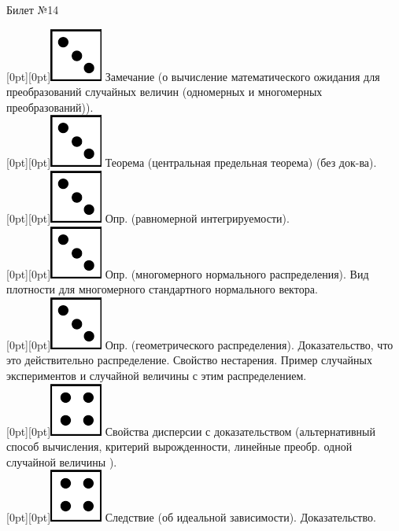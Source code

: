 \documentclass[10pt]{article}
\begin{document}
\begin{center} {\Large Билет №14} \end{center} 

\raisebox{-1pt}[0pt][0pt]{\includegraphics[width=0.02\linewidth]{3.png}} Замечание (о вычисление  математического ожидания для преобразований случайных величин (одномерных и многомерных преобразований)). \\

\raisebox{-1pt}[0pt][0pt]{\includegraphics[width=0.02\linewidth]{3.png}} Теорема (центральная предельная теорема) (без док-ва). \\

\raisebox{-1pt}[0pt][0pt]{\includegraphics[width=0.02\linewidth]{3.png}} Опр. (равномерной интегрируемости). \\

\raisebox{-1pt}[0pt][0pt]{\includegraphics[width=0.02\linewidth]{3.png}} Опр. (многомерного нормального распределения). Вид плотности для многомерного стандартного нормального вектора. \\ 

\raisebox{-1pt}[0pt][0pt]{\includegraphics[width=0.02\linewidth]{3.png}}  Опр. (геометрического распределения). Доказательство, что это действительно распределение. Свойство нестарения. Пример случайных экспериментов и случайной величины с этим распределением. \\      

\raisebox{-1pt}[0pt][0pt]{\includegraphics[width=0.02\linewidth]{4.png}} Свойства дисперсии с доказательством (альтернативный способ вычисления, критерий вырожденности, линейные преобр. одной случайной величины ). \\ 

\raisebox{-1pt}[0pt][0pt]{\includegraphics[width=0.02\linewidth]{4.png}} Следствие (об идеальной зависимости). Доказательство. \\
\end{document}
